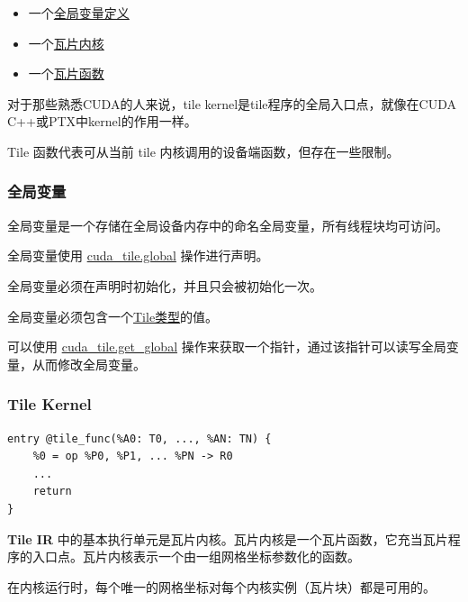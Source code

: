 \documentclass{article}
\begin{document}
\begin{itemize}
\item 一个\href{https://docs.nvidia.com/cuda/tile-ir/latest/sections/semantics.html#sub-sec-tile-global}{全局变量定义}
\item 一个\href{https://docs.nvidia.com/cuda/tile-ir/latest/sections/semantics.html#sub-sec-tile-kernel}{瓦片内核}
\item 一个\href{https://docs.nvidia.com/cuda/tile-ir/latest/sections/semantics.html#sub-sec-tile-function}{瓦片函数}

\end{itemize}
对于那些熟悉CUDA的人来说，tile kernel是tile程序的全局入口点，就像在CUDA C++或PTX中kernel的作用一样。

Tile 函数代表可从当前 tile 内核调用的设备端函数，但存在一些限制。


\subsubsection{全局变量}

全局变量是一个存储在全局设备内存中的命名全局变量，所有线程块均可访问。

全局变量使用 \href{https://docs.nvidia.com/cuda/tile-ir/latest/sections/operations.html#op-cuda-tile-global}{cuda\_tile.global} 操作进行声明。

全局变量必须在声明时初始化，并且只会被初始化一次。


全局变量必须包含一个\href{https://docs.nvidia.com/cuda/tile-ir/latest/sections/types.html#type-tile}{Tile类型}的值。


可以使用 \href{https://docs.nvidia.com/cuda/tile-ir/latest/sections/operations.html#op-cuda-tile-get-global}{cuda\_tile.get\_global} 操作来获取一个指针，通过该指针可以读写全局变量，从而修改全局变量。



\subsubsection{Tile Kernel}

\begin{lstlisting}
entry @tile_func(%A0: T0, ..., %AN: TN) {
    %0 = op %P0, %P1, ... %PN -> R0
    ...
    return
}
\end{lstlisting}

\textbf{Tile IR} 中的基本执行单元是瓦片内核。瓦片内核是一个瓦片函数，它充当瓦片程序的入口点。瓦片内核表示一个由一组网格坐标参数化的函数。

在内核运行时，每个唯一的网格坐标对每个内核实例（瓦片块）都是可用的。
\end{document}
